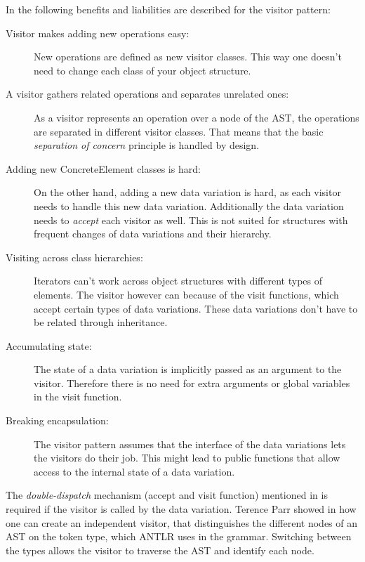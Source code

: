 \documentclass{llncs}
\begin{document}
In \cite{GHJV94} the following benefits and liabilities are described for the visitor pattern:

\begin{description}
	\item[Visitor makes adding new operations easy:] New operations are defined as new visitor classes. This way one doesn't need to change each class of your object structure.
	
	\item[A visitor gathers related operations and separates unrelated ones:] As a visitor represents an operation over a node of the AST, the operations are separated in different visitor classes. That means that the basic \emph{separation of concern} principle is handled by design.
	
	\item[Adding new ConcreteElement classes is hard:] On the other hand, adding a new data variation is hard, as each visitor needs to handle this new data variation. Additionally the data variation needs to \emph{accept} each visitor as well. This is not suited for structures with frequent changes of data variations and their hierarchy.
	
	\item[Visiting across class hierarchies:] Iterators can't work across object structures with different types of elements. The visitor however can because of the visit functions, which accept certain types of data variations. These data variations don't have to be related through inheritance.
	
	\item[Accumulating state:] The state of a data variation is implicitly passed as an argument to the visitor. Therefore there is no need for extra arguments or global variables in the visit function.
	
	\item[Breaking encapsulation:] The visitor pattern assumes that the interface of the data variations lets the visitors do their job. This might lead to public functions that allow access to the internal state of a data variation.
\end{description}

The \emph{double-dispatch} mechanism (accept and visit function) mentioned in \cite{GHJV94} is required if the visitor is called by the data variation. Terence Parr showed in \cite{Parr09} how one can create an independent visitor, that distinguishes the different nodes of an AST on the token type, which ANTLR uses in the grammar. Switching between the types allows the visitor to traverse the AST and identify each node.
\end{document}
